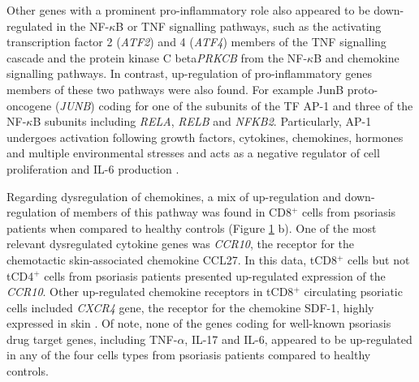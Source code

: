 \begin{figure}[htbp]
\label{figure:RNAseq_PS_CTL_CD8_TNF_and_chemokine_pathway_modified}
\end{figure}





Other genes with a prominent pro-inflammatory role also appeared to be down-regulated in the NF-$\kappa$B or TNF signalling pathways, such as the activating transcription factor 2 (\textit{ATF2}) and 4 (\textit{ATF4}) members of the TNF signalling cascade and the protein kinase C beta\textit{PRKCB} from the NF-$\kappa$B and chemokine signalling pathways. In contrast, up-regulation of pro-inflammatory genes members of these two pathways were also found. For example JunB proto-oncogene (\textit{JUNB}) coding for one of the subunits of the TF AP-1 and three of the NF-$\kappa$B subunits including \textit{RELA}, \textit{RELB} and \textit{NFKB2}. Particularly, AP-1 undergoes activation following growth factors, cytokines, chemokines, hormones and multiple environmental stresses and acts as a negative regulator of cell proliferation and IL-6 production \parencite{Schonthaler2011}.

Regarding dysregulation of chemokines, a mix of up-regulation and down-regulation of members of this pathway was found in CD8$^+$ cells from psoriasis patients when compared to healthy controls (Figure \ref{figure:RNAseq_PS_CTL_CD8_TNF_and_chemokine_pathway_modified} b). One of the most relevant dysregulated cytokine genes was \textit{CCR10}, the receptor for the chemotactic skin-associated chemokine CCL27. In this data, tCD8$^+$ cells but not tCD4$^+$ cells from psoriasis patients presented up-regulated expression of the \textit{CCR10}. Other up-regulated chemokine receptors in tCD8$^+$ circulating psoriatic cells included \textit{CXCR4} gene, the receptor for the chemokine SDF-1, highly expressed in skin \parencite{Zgraggen2014}. Of note, none of the genes coding for well-known psoriasis drug target genes, including TNF-$\alpha$, IL-17 and IL-6, appeared to be up-regulated in any of the four cells types from psoriasis patients compared to healthy controls.



